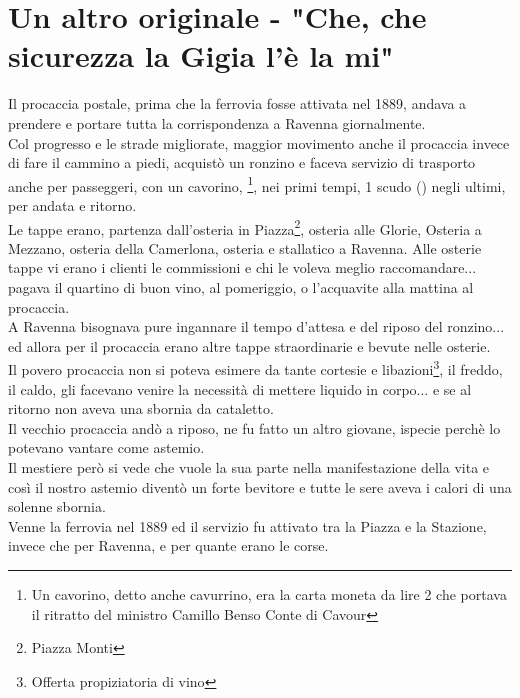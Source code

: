 \documentclass[10pt]{memoir} %
\begin{document}
\chapter{Un altro originale - "Che, che sicurezza la Gigia l'è la mi"}
Il procaccia postale, prima che la ferrovia fosse attivata nel 1889, andava a prendere e portare tutta la corrispondenza a Ravenna giornalmente.\\
Col progresso e le strade migliorate, maggior movimento anche il procaccia invece di fare il cammino a piedi, acquistò un ronzino e faceva servizio di trasporto anche per passeggeri, con un cavorino, \normalfont \:\:\footnote{Un cavorino, detto anche cavurrino, era la carta moneta da lire 2 che portava il ritratto del ministro Camillo Benso Conte di Cavour}, nei primi tempi, 1 scudo (\normalfont \:\:) negli ultimi, per andata e ritorno. \\
Le tappe erano, partenza dall'osteria in Piazza\footnote{Piazza Monti}, osteria alle Glorie, Osteria a Mezzano, osteria della Camerlona, osteria e stallatico a Ravenna. Alle osterie tappe vi erano i clienti le commissioni e chi le voleva meglio raccomandare... pagava il quartino di buon vino, al pomeriggio, o l'acquavite alla mattina al procaccia.\\
A Ravenna bisognava pure ingannare il tempo d'attesa e del riposo del ronzino... ed allora per il procaccia erano altre tappe straordinarie e bevute nelle osterie.\\
Il povero procaccia non si poteva esimere da tante cortesie e libazioni\footnote{Offerta propiziatoria di vino}, il freddo, il caldo, gli facevano venire la necessità di mettere liquido in corpo... e se al ritorno non aveva una sbornia da cataletto.\\
Il vecchio procaccia andò a riposo, ne fu fatto un altro giovane, ispecie perchè lo potevano vantare come astemio.\\
Il mestiere però si vede che vuole la sua parte nella manifestazione della vita e così il nostro astemio diventò un forte bevitore e tutte le sere aveva i calori di una solenne sbornia.\\
Venne la ferrovia nel 1889 ed il servizio fu attivato tra la Piazza e la Stazione, invece che per Ravenna, e per quante erano le corse.\\
\end{document}
